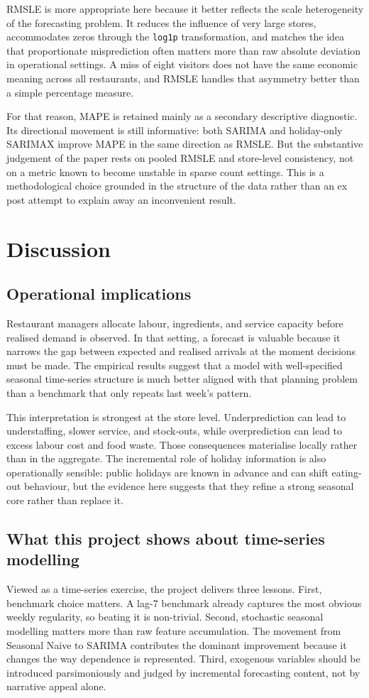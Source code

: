 \documentclass[11pt,oneside]{scrartcl}
\begin{document}
RMSLE is more appropriate here because it better reflects the scale heterogeneity of the forecasting problem. It reduces the influence of very large stores, accommodates zeros through the \texttt{log1p} transformation, and matches the idea that proportionate misprediction often matters more than raw absolute deviation in operational settings. A miss of eight visitors does not have the same economic meaning across all restaurants, and RMSLE handles that asymmetry better than a simple percentage measure.

For that reason, MAPE is retained mainly as a secondary descriptive diagnostic. Its directional movement is still informative: both SARIMA and holiday-only SARIMAX improve MAPE in the same direction as RMSLE. But the substantive judgement of the paper rests on pooled RMSLE and store-level consistency, not on a metric known to become unstable in sparse count settings. This is a methodological choice grounded in the structure of the data rather than an ex post attempt to explain away an inconvenient result.

\section{Discussion}
\subsection{Operational implications}
Restaurant managers allocate labour, ingredients, and service capacity before realised demand is observed. In that setting, a forecast is valuable because it narrows the gap between expected and realised arrivals at the moment decisions must be made. The empirical results suggest that a model with well-specified seasonal time-series structure is much better aligned with that planning problem than a benchmark that only repeats last week's pattern.

This interpretation is strongest at the store level. Underprediction can lead to understaffing, slower service, and stock-outs, while overprediction can lead to excess labour cost and food waste. Those consequences materialise locally rather than in the aggregate. The incremental role of holiday information is also operationally sensible: public holidays are known in advance and can shift eating-out behaviour, but the evidence here suggests that they refine a strong seasonal core rather than replace it.

\subsection{What this project shows about time-series modelling}
Viewed as a time-series exercise, the project delivers three lessons. First, benchmark choice matters. A lag-7 benchmark already captures the most obvious weekly regularity, so beating it is non-trivial. Second, stochastic seasonal modelling matters more than raw feature accumulation. The movement from Seasonal Naive to SARIMA contributes the dominant improvement because it changes the way dependence is represented. Third, exogenous variables should be introduced parsimoniously and judged by incremental forecasting content, not by narrative appeal alone.
\end{document}
